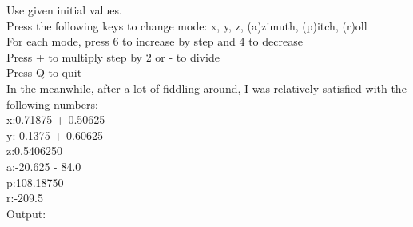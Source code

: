 Use given initial values.\\
Press the following keys to change mode: x, y, z, (a)zimuth, (p)itch, (r)oll\\
For each mode, press 6 to increase by step and 4 to decrease\\
Press + to multiply step by 2 or - to divide\\
Press Q to quit\\



In the meanwhile, after a lot of fiddling around, I was relatively satisfied with the following numbers:\\
x:0.71875 + 0.50625\\
y:-0.1375 + 0.60625\\
z:0.5406250\\
a:-20.625 - 84.0\\
p:108.18750\\
r:-209.5\\
Output:\\

